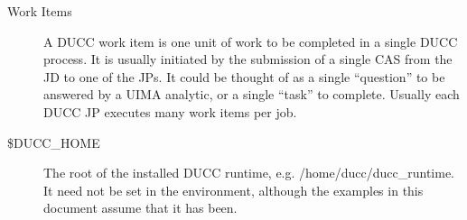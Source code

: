 \begin{description}
\item[Work Items] A DUCC work item is one unit of work to be completed in a single DUCC process. It
  is usually initiated by the submission of a single CAS from the JD to one of the JPs. It could be
  thought of as a single ``question'' to be answered by a UIMA analytic, or a single ``task'' to
  complete. Usually each DUCC JP executes many work items per job.

\item[\$DUCC\_HOME] The root of the installed DUCC runtime, e.g. /home/ducc/ducc\_runtime.  
  It need not be set in the environment, although the examples in this document assume that it has been.

\end{description}


